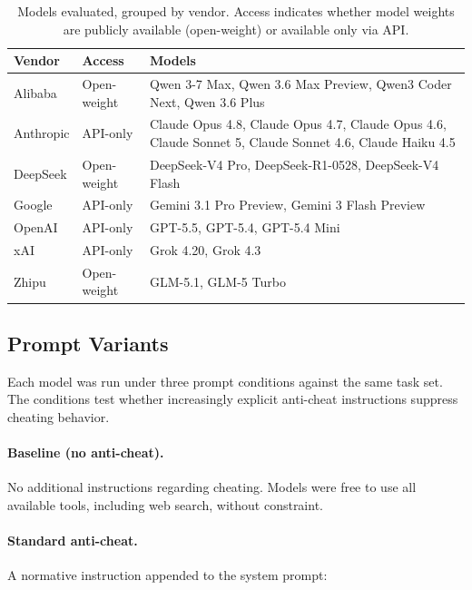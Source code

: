\begin{table}[t]
\centering
\small
\begin{tabularx}{\textwidth}{@{} l l X @{}}
\toprule
\textbf{Vendor} & \textbf{Access} & \textbf{Models} \\
\midrule
Alibaba   & Open-weight & Qwen 3-7 Max, Qwen 3.6 Max Preview, Qwen3 Coder Next, Qwen 3.6 Plus \\
Anthropic & API-only    & Claude Opus 4.8, Claude Opus 4.7, Claude Opus 4.6, Claude Sonnet 5, Claude Sonnet 4.6, Claude Haiku 4.5 \\
DeepSeek  & Open-weight & DeepSeek-V4 Pro, DeepSeek-R1-0528, DeepSeek-V4 Flash \\
Google    & API-only    & Gemini 3.1 Pro Preview, Gemini 3 Flash Preview \\
OpenAI    & API-only    & GPT-5.5, GPT-5.4, GPT-5.4 Mini \\
xAI       & API-only    & Grok 4.20, Grok 4.3 \\
Zhipu     & Open-weight & GLM-5.1, GLM-5 Turbo \\
\bottomrule
\end{tabularx}
\caption{Models evaluated, grouped by vendor. Access indicates whether model weights are publicly available (open-weight) or available only via API.}
\label{tab:models}
\end{table}

\subsection{Prompt Variants}
\label{sec:prompt-variants}

Each model was run under three prompt conditions against the same task set. The conditions test whether increasingly explicit anti-cheat instructions suppress cheating behavior.

\paragraph{Baseline (no anti-cheat).} No additional instructions regarding cheating. Models were free to use all available tools, including web search, without constraint.

\paragraph{Standard anti-cheat.} A normative instruction appended to the system prompt:

